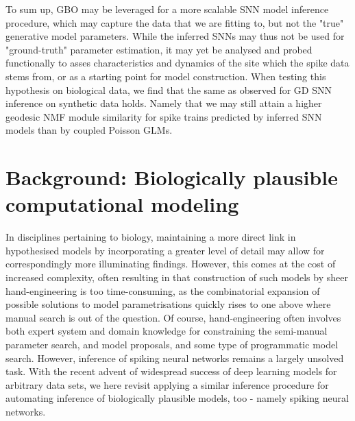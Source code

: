 \documentclass[mphil,deptreport,ianc]{infthesis} %
\begin{document}
To sum up,
GBO may be leveraged for a more scalable SNN model inference procedure, which may capture the data that we are fitting to, but not the "true" generative model parameters.
While the inferred SNNs may thus not be used for "ground-truth" parameter estimation, it may yet be analysed and probed functionally to asses characteristics and dynamics of the site which the spike data stems from, or as a starting point for model construction.
When testing this hypothesis on biological data, we find that the same as observed for GD SNN inference on synthetic data holds. Namely that we may still attain a higher geodesic NMF module similarity for spike trains predicted by inferred SNN models than by coupled Poisson GLMs.


\chapter{Background: Biologically plausible computational modeling}\label{chpt:background}

In disciplines pertaining to biology, maintaining a more direct link in hypothesised models by incorporating a greater level of detail may allow for correspondingly more illuminating findings.
However, this comes at the cost of increased complexity, often resulting in that construction of such models by sheer hand-engineering is too time-consuming, as the combinatorial expansion of possible solutions to model parametrisations quickly rises to one above where manual search is out of the question.
Of course, hand-engineering often involves both expert system and domain knowledge for constraining the semi-manual parameter search, and model proposals, and some type of programmatic model search.
However, inference of spiking neural networks remains a largely unsolved task.
With the recent advent of widespread success of deep learning models for arbitrary data sets, we here revisit applying a similar inference procedure for automating inference of biologically plausible models, too - namely spiking neural networks.
\end{document}
